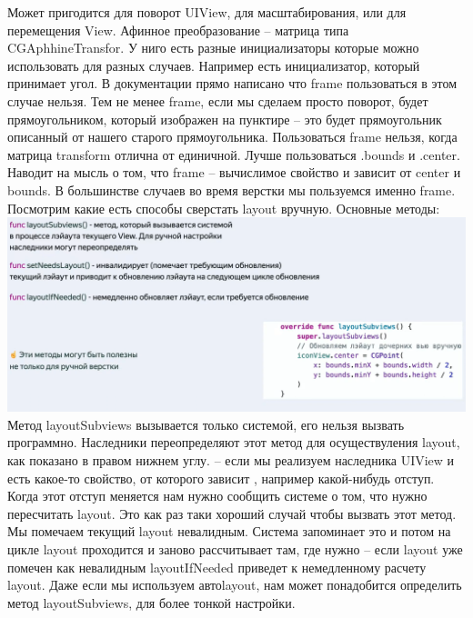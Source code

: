 \documentclass{article}
\begin{document}
    \newline
    Может пригодится для поворот UIView, для масштабирования, или для перемещения View. Афинное преобразование -- матрица типа CGAphhineTransfor. У ниго есть разные инициализаторы которые можно использовать для разных случаев. Например есть инициализатор, который принимает угол. В документации прямо написано что frame пользоваться в этом случае нельзя. Тем не менее frame, если мы сделаем просто поворот, будет прямоугольником, который изображен на пунктире -- это будет прямоугольник описанный от нашего старого прямоугольника. Пользоваться frame нельзя, когда матрица transform отлична от единичной. Лучше пользоваться .bounds и .center. Наводит на мысль о том, что frame -- вычислимое свойство и зависит от center и bounds. В большинстве случаев во время верстки мы пользуемся именно frame. 
    \newline
    Посмотрим какие есть способы сверстать layout вручную. Основные методы:
    \newline
    \includegraphics[scale = 0.3]{pic/Снимок экрана 2023-07-31 в 21.24.33.png}
    Метод layoutSubviews вызывается только системой, его нельзя вызвать программно. Наследники переопределяют этот метод для осуществуления layout, как показано в правом нижнем углу. 
    \newline
     -- если мы реализуем наследника UIView и есть какое-то свойство, от которого зависит , например какой-нибудь отступ. Когда этот отступ меняется нам нужно сообщить системе о том, что нужно пересчитать layout. Это как раз таки хороший случай чтобы вызвать этот метод. Мы помечаем текущий layout невалидным. Система запоминает это и потом на цикле layout проходится и заново рассчитывает там, где нужно
    \newline
     -- если layout уже помечен как невалидным layoutIfNeeded приведет к немедленному расчету layout. 
    \newline
    Даже если мы используем автоlayout, нам может понадобится определить метод layoutSubviews, для более тонкой настройки.
\end{document}
